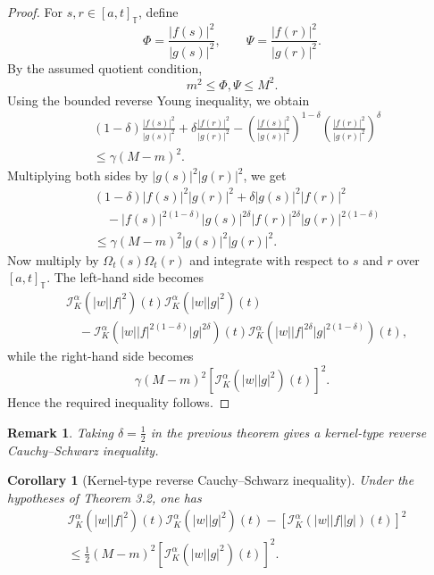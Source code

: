 \documentclass[11pt]{article}
\newtheorem{corollary}[theorem]{Corollary}
\newtheorem{remark}[theorem]{Remark}
\begin{document}
\begin{proof}
For $s,r\in[a,t]_{\mathbb{T}}$, define
\[
    \Phi=\frac{|f(s)|^2}{|g(s)|^2},
    \qquad
    \Psi=\frac{|f(r)|^2}{|g(r)|^2}.
\]
By the assumed quotient condition,
\[
    m^2\leq \Phi,\Psi\leq M^2.
\]
Using the bounded reverse Young inequality, we obtain
\[
\begin{aligned}
&(1-\delta)\frac{|f(s)|^2}{|g(s)|^2}
+\delta\frac{|f(r)|^2}{|g(r)|^2}
-\left(\frac{|f(s)|^2}{|g(s)|^2}\right)^{1-\delta}
 \left(\frac{|f(r)|^2}{|g(r)|^2}\right)^{\delta}       \\
&\leq
\gamma(M-m)^2.
\end{aligned}
\]
Multiplying both sides by $|g(s)|^2|g(r)|^2$, we get
\[
\begin{aligned}
&(1-\delta)|f(s)|^2|g(r)|^2
+\delta |g(s)|^2|f(r)|^2                                      \\
&\quad
-|f(s)|^{2(1-\delta)}|g(s)|^{2\delta}
 |f(r)|^{2\delta}|g(r)|^{2(1-\delta)}                         \\
&\leq
\gamma(M-m)^2|g(s)|^2|g(r)|^2.
\end{aligned}
\]
Now multiply by $\Omega_t(s)\Omega_t(r)$ and integrate with respect to $s$ and
$r$ over $[a,t]_{\mathbb{T}}$. The left-hand side becomes
\[
\begin{aligned}
&
\mathcal{I}_{K}^{\alpha}(|w||f|^2)(t)
\mathcal{I}_{K}^{\alpha}(|w||g|^2)(t)                                      \\
&\quad -
\mathcal{I}_{K}^{\alpha}
\left(|w||f|^{2(1-\delta)}|g|^{2\delta}\right)(t)
\mathcal{I}_{K}^{\alpha}
\left(|w||f|^{2\delta}|g|^{2(1-\delta)}\right)(t),
\end{aligned}
\]
while the right-hand side becomes
\[
    \gamma(M-m)^2
    \left[
    \mathcal{I}_{K}^{\alpha}(|w||g|^2)(t)
    \right]^2.
\]
Hence the required inequality follows.
\end{proof}

\begin{remark}
Taking $\delta=\frac12$ in the previous theorem gives a kernel-type reverse
Cauchy--Schwarz inequality.
\end{remark}

\begin{corollary}[Kernel-type reverse Cauchy--Schwarz inequality]
Under the hypotheses of Theorem 3.2, one has
\[
\begin{aligned}
&
\mathcal{I}_{K}^{\alpha}(|w||f|^2)(t)
\mathcal{I}_{K}^{\alpha}(|w||g|^2)(t)
-
\left[
\mathcal{I}_{K}^{\alpha}(|w||f||g|)(t)
\right]^2                                                    \\
&\leq
\frac12(M-m)^2
\left[
\mathcal{I}_{K}^{\alpha}(|w||g|^2)(t)
\right]^2.
\end{aligned}
\]
\end{corollary}
\end{document}
